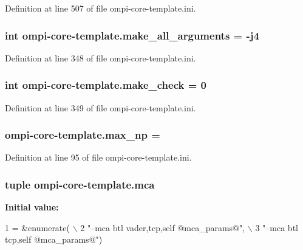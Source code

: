 Definition at line 507 of file ompi-\/core-\/template.\-ini.

\hypertarget{namespaceompi-core-template_a7e4e240833589ea0dd76624fe36aa7ed}{
\subsubsection[{make\-\_\-all\-\_\-arguments}]{\setlength{\rightskip}{0pt plus 5cm}int ompi-\/core-\/template.\-make\-\_\-all\-\_\-arguments = -\/j4}}\label{namespaceompi-core-template_a7e4e240833589ea0dd76624fe36aa7ed}


Definition at line 348 of file ompi-\/core-\/template.\-ini.

\hypertarget{namespaceompi-core-template_af74a20b172057ad9db8c98040d6695ab}{
\subsubsection[{make\-\_\-check}]{\setlength{\rightskip}{0pt plus 5cm}int ompi-\/core-\/template.\-make\-\_\-check = 0}}\label{namespaceompi-core-template_af74a20b172057ad9db8c98040d6695ab}


Definition at line 349 of file ompi-\/core-\/template.\-ini.

\hypertarget{namespaceompi-core-template_aef06f55877b195b98c9e7e6689f18064}{
\subsubsection[{max\-\_\-np}]{\setlength{\rightskip}{0pt plus 5cm}ompi-\/core-\/template.\-max\-\_\-np =}}\label{namespaceompi-core-template_aef06f55877b195b98c9e7e6689f18064}


Definition at line 95 of file ompi-\/core-\/template.\-ini.

\hypertarget{namespaceompi-core-template_a8bec0c2630d37f5891ff642df3f9de76}{
\subsubsection[{mca}]{\setlength{\rightskip}{0pt plus 5cm}tuple ompi-\/core-\/template.\-mca}}\label{namespaceompi-core-template_a8bec0c2630d37f5891ff642df3f9de76}
{\bfseries Initial value\-:}
\begin{DoxyCode}
1 = &enumerate( \(\backslash\)
2         \textcolor{stringliteral}{"--mca btl vader,tcp,self @mca\_params@"}, \(\backslash\)
3         \textcolor{stringliteral}{"--mca btl tcp,self @mca\_params@"})
\end{DoxyCode}


